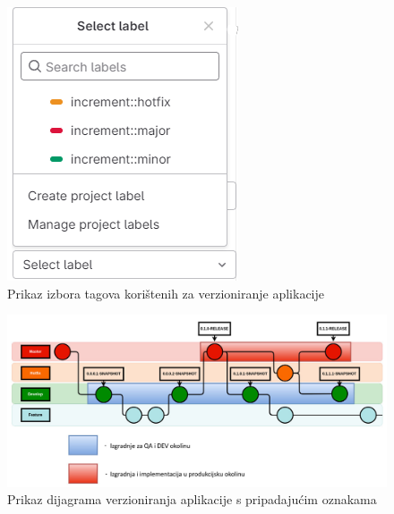 \documentclass[a4paper,12pt,oneside]{article}
\begin{document}
\begin{figure}
    \centering
    \includegraphics[width=0.4\linewidth]{Slike/label-selection.png}
    \caption{Prikaz izbora tagova korištenih za verzioniranje aplikacije}
    \label{fig:label selection}
\end{figure}

\begin{figure}
    \centering
    \includegraphics[width=1\linewidth]{Slike/versioning-tree.png}
    \caption{Prikaz dijagrama verzioniranja aplikacije s pripadajućim oznakama \cite{base58}}
    \label{fig:versioning-tree}
\end{figure}
\end{document}
